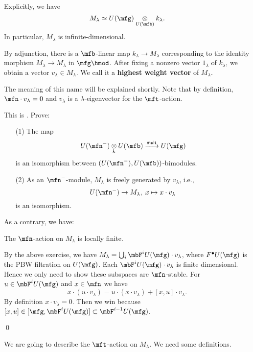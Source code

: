 \begin{rem}
Explicitly, we have
\[
	M_\lambda \simeq U(\mfg)\ot_{U(\mfb)} k_\lambda.
\]
In particular, $M_\lambda$ is infinite-dimensional.
\end{rem}

\begin{defn}
	By adjunction, there is a $\mfb$-linear map $k_\lambda\to M_\lambda$ corresponding to the identity morphism $M_\lambda\to M_\lambda$ in $\mfg\hmod$. After fixing a nonzero vector $1_\lambda$ of $k_\lambda$, we obtain a vector $v_\lambda \in M_\lambda$. We call it a \textbf{highest weight vector} of $M_\lambda$.
\end{defn}

The meaning of this name will be explained shortly. Note that by definition, $\mfn\cdot v_\lambda=0$ and $v_\lambda$ is a $\lambda$-eigenvector for the $\mft$-action.

\begin{exe}\label{exe-Verma}
	This is . Prove:
	\begin{itemize}
		\item[(1)]
			The map
			\[
				U(\mfn^-) \ot_k U (\mfb) \xrightarrow{\mathsf{mult}} U(\mfg)
			\]
			is an isomorphism between $(U(\mfn^-) , U (\mfb))$-bimodules.
		\item[(2)]
			As an $\mfn^-$-module, $M_\lambda$ is freely generated by $v_\lambda$, i.e.,
			\[
				U(\mfn^-) \to M_\lambda,\; x \mapsto x\cdot v_\lambda
			\]
			is an isomorphism.
	\end{itemize}
\end{exe}

As a contrary, we have:

\begin{lem}
	The $\mfn$-action on $M_\lambda$ is locally finite.
\end{lem}

\proof
	By the above exercise, we have $M_\lambda = \bigcup_i \mbF^i U(\mfg)\cdot v_\lambda$, where $F^\bullet U(\mfg)$ is the PBW filtration on $U(\mfg)$. Each $ \mbF^i U(\mfg)\cdot v_\lambda$ is finite dimensional. Hence we only need to show these subspaces are $\mfn$-stable. For $u\in \mbF^i U(\mfg)$ and $x\in \mfn$ we have
	\[
		x\cdot (u\cdot v_\lambda) = u\cdot (x\cdot v_\lambda) + [x,u]\cdot v_\lambda. 
	\]
	By definition $x\cdot v_\lambda=0$. Then we win because $[x,u]\in [\mfg, \mbF^i U(\mfg)] \subset \mbF^{i-1} U(\mfg)$.

\qed


We are going to describe the $\mft$-action on $M_\lambda$. We need some definitions.

